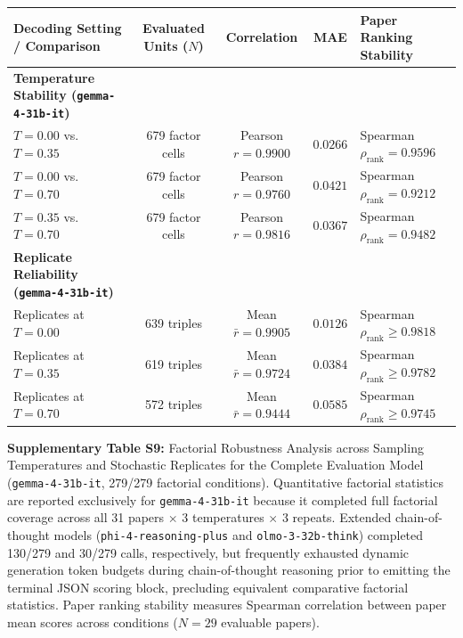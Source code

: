 \documentclass[12pt]{article}
\begin{document}
\newpage

\begingroup
\small
\setlength{\tabcolsep}{4pt}
\noindent\begin{tabularx}{\textwidth}{@{}p{2.2in} c c c >{\raggedright\arraybackslash}X@{}}
\toprule
\textbf{Decoding Setting / Comparison} & \textbf{Evaluated Units ($N$)} & \textbf{Correlation} & \textbf{MAE} & \textbf{Paper Ranking Stability} \\
\midrule
\textbf{Temperature Stability (\texttt{gemma-4-31b-it})} & & & & \\
\quad $T = 0.00$ vs. $T = 0.35$ & 679 factor cells & Pearson $r = 0.9900$ & $0.0266$ & Spearman $\rho_{\text{rank}} = 0.9596$ \\
\quad $T = 0.00$ vs. $T = 0.70$ & 679 factor cells & Pearson $r = 0.9760$ & $0.0421$ & Spearman $\rho_{\text{rank}} = 0.9212$ \\
\quad $T = 0.35$ vs. $T = 0.70$ & 679 factor cells & Pearson $r = 0.9816$ & $0.0367$ & Spearman $\rho_{\text{rank}} = 0.9482$ \\
\midrule
\textbf{Replicate Reliability (\texttt{gemma-4-31b-it})} & & & & \\
\quad Replicates at $T = 0.00$ & 639 triples & Mean $\bar{r} = 0.9905$ & $0.0126$ & Spearman $\rho_{\text{rank}} \ge 0.9818$ \\
\quad Replicates at $T = 0.35$ & 619 triples & Mean $\bar{r} = 0.9724$ & $0.0384$ & Spearman $\rho_{\text{rank}} \ge 0.9782$ \\
\quad Replicates at $T = 0.70$ & 572 triples & Mean $\bar{r} = 0.9444$ & $0.0585$ & Spearman $\rho_{\text{rank}} \ge 0.9745$ \\
\bottomrule
\end{tabularx}
\endgroup
\vspace{0.4em}

\noindent\textbf{Supplementary Table S9:} Factorial Robustness Analysis across Sampling Temperatures and Stochastic Replicates for the Complete Evaluation Model (\texttt{gemma-4-31b-it}, 279/279 factorial conditions). Quantitative factorial statistics are reported exclusively for \texttt{gemma-4-31b-it} because it completed full factorial coverage across all 31 papers $\times$ 3 temperatures $\times$ 3 repeats. Extended chain-of-thought models (\texttt{phi-4-reasoning-plus} and \texttt{olmo-3-32b-think}) completed 130/279 and 30/279 calls, respectively, but frequently exhausted dynamic generation token budgets during chain-of-thought reasoning prior to emitting the terminal JSON scoring block, precluding equivalent comparative factorial statistics. Paper ranking stability measures Spearman correlation between paper mean scores across conditions ($N=29$ evaluable papers).
\end{document}
